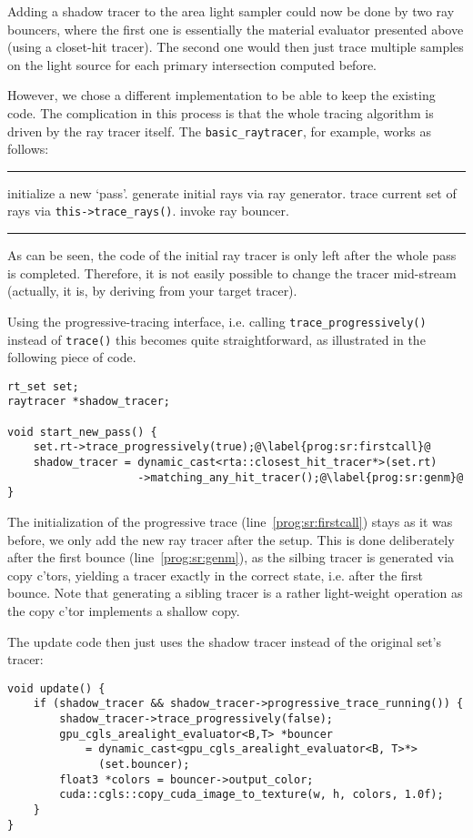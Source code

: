 \documentclass[a4paper,11pt]{scrartcl}
\newenvironment{alg}{
	\medskip\hrule
	\begin{algorithmic}}
	{\end{algorithmic}
	\hrule\medskip}
\begin{document}
Adding a shadow tracer to the area light sampler could now be done by two ray bouncers, 
	where the first one is essentially the material evaluator presented above (using a closet-hit tracer).
The second one would then just trace multiple samples on the light source for each primary intersection computed before.

However, we chose a different implementation to be able to keep the existing code.
The complication in this process is that the whole tracing algorithm is driven by the ray tracer itself.
The \lstinline|basic_raytracer|, for example, works as follows:
\begin{alg}
\State initialize a new `pass'.
\State generate initial rays via ray generator.
\Repeat
	\State trace current set of rays via \lstinline|this->trace_rays()|.
	\State invoke ray bouncer.
\end{alg}
As can be seen, the code of the initial ray tracer is only left after the whole pass is completed.
Therefore, it is not easily possible to change the tracer mid-stream
	(actually, it is, by deriving from your target tracer).

Using the progressive-tracing interface, i.e. calling \lstinline|trace_progressively()| instead of \lstinline|trace()|
	this becomes quite straightforward, as illustrated in the following piece of code.
\begin{lstlisting}
rt_set set;
raytracer *shadow_tracer;

void start_new_pass() {
	set.rt->trace_progressively(true);@\label{prog:sr:firstcall}@
	shadow_tracer = dynamic_cast<rta::closest_hit_tracer*>(set.rt)
	                ->matching_any_hit_tracer();@\label{prog:sr:genm}@
}
\end{lstlisting}
The initialization of the progressive trace (line~\ref{prog:sr:firstcall}) stays as it was before,
	we only add the new ray tracer after the setup.
This is done deliberately after the first bounce (line~\ref{prog:sr:genm}), as the silbing tracer is generated via copy c'tors, 
	yielding a tracer exactly in the correct state, i.e. after the first bounce.
Note that generating a sibling tracer is a rather light-weight operation as the copy c'tor implements a shallow copy.

The update code then just uses the shadow tracer instead of the original set's tracer:
\begin{lstlisting}
void update() {
	if (shadow_tracer && shadow_tracer->progressive_trace_running()) {
		shadow_tracer->trace_progressively(false);
		gpu_cgls_arealight_evaluator<B,T> *bouncer 
			= dynamic_cast<gpu_cgls_arealight_evaluator<B, T>*>
			  (set.bouncer);
		float3 *colors = bouncer->output_color;
		cuda::cgls::copy_cuda_image_to_texture(w, h, colors, 1.0f);
	}
}
\end{lstlisting}
\end{document}

